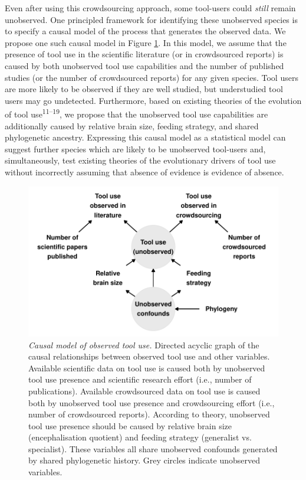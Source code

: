 \documentclass[
  man,floatsintext]{apa6}
\begin{document}
Even after using this crowdsourcing approach, some tool-users could \emph{still}
remain unobserved. One principled framework for identifying these unobserved species
is to specify a causal model of the process that generates the observed data. We
propose one such causal model in Figure \ref{fig:plotDAG}. In this model, we
assume that the presence of tool use in the scientific literature (or in
crowdsourced reports) is caused by both unobserved tool use capabilities and the
number of published studies (or the number of crowdsourced reports) for any
given species. Tool users are more likely to be observed if they are well
studied, but understudied tool users may go undetected. Furthermore, based on
existing theories of the evolution of tool use\textsuperscript{11--19}, we propose that the
unobserved tool use capabilities are additionally caused by relative brain size,
feeding strategy, and shared phylogenetic ancestry. Expressing this causal model
as a statistical model can suggest further species which are likely to be
unobserved tool-users and, simultaneously, test existing theories of the
evolutionary drivers of tool use without incorrectly assuming that absence of
evidence is evidence of absence.












\begin{figure}
\centering
\includegraphics{manuscript_files/figure-latex/plotDAG-1.pdf}
\caption{\label{fig:plotDAG}\emph{Causal model of observed tool use.} Directed acyclic graph
of the causal relationships between observed tool use and other variables.
Available scientific data on tool use is caused both by unobserved tool use
presence and scientific research effort (i.e., number of publications).
Available crowdsourced data on tool use is caused both by unobserved tool use
presence and crowdsourcing effort (i.e., number of crowdsourced reports).
According to theory, unobserved tool use presence should be caused by relative
brain size (encephalisation quotient) and feeding strategy (generalist vs.~
specialist). These variables all share unobserved confounds generated by shared
phylogenetic history. Grey circles indicate unobserved variables.}
\end{figure}
\end{document}
